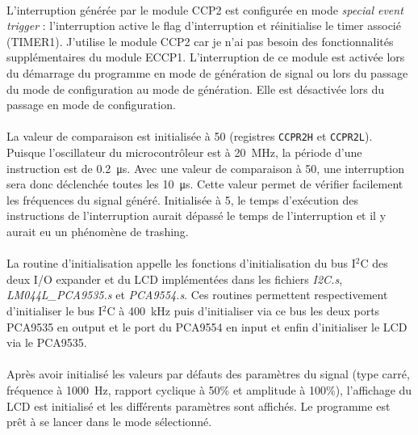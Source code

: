 \documentclass{article}
\begin{document}
    \paragraph{}
    L'interruption générée par le module CCP2 est configurée en mode \emph{special event trigger} : l'interruption active le flag d'interruption et réinitialise le timer associé (TIMER1). J'utilise le module CCP2 car je n'ai pas besoin des fonctionnalités supplémentaires du module ECCP1. L'interruption de ce module est activée lors du démarrage du programme en mode de génération de signal ou lors du passage du mode de configuration au mode de génération. Elle est désactivée lors du passage en mode de configuration.

    \paragraph{}
    La valeur de comparaison est initialisée à 50 (registres \texttt{CCPR2H} et \texttt{CCPR2L}). Puisque l'oscillateur du microcontrôleur est à \SI{20}{\mega\hertz}, la période d'une instruction est de \SI{0.2}{\micro\second}. Avec une valeur de comparaison à 50, une interruption sera donc déclenchée toutes les \SI{10}{\micro\second}. Cette valeur permet de vérifier facilement les fréquences du signal généré. Initialisée à 5, le temps d'exécution des instructions de l'interruption aurait dépassé le temps de l'interruption et il y aurait eu un phénomène de trashing.

    \paragraph{}
    La routine d'initialisation appelle les fonctions d'initialisation du bus I$^2$C des deux I/O expander et du LCD implémentées dans les fichiers \emph{I2C.s}, \emph{LM044L\_PCA9535.s} et \emph{PCA9554.s}. Ces routines permettent respectivement d'initialiser le bus I$^2$C à \SI{400}{\kilo\hertz} puis d'initialiser via ce bus les deux ports PCA9535 en output et le port du PCA9554 en input et enfin d'initialiser le LCD via le PCA9535.

    \paragraph{}
    Après avoir initialisé les valeurs par défauts des paramètres du signal (type carré, fréquence à \SI{1000}{\hertz}, rapport cyclique à 50\% et amplitude à 100\%), l'affichage du LCD est initialisé et les différents paramètres sont affichés. Le programme est prêt à se lancer dans le mode sélectionné.
\end{document}
